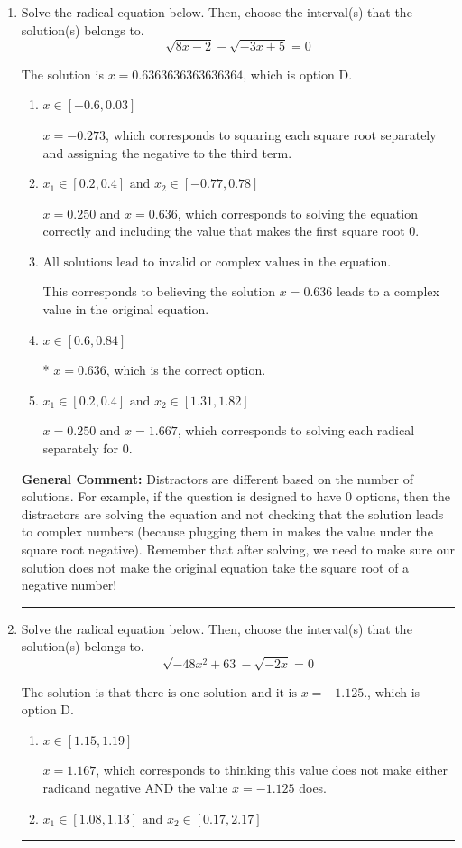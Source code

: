 \documentclass{extbook}[14pt]
\newcommand{\litem}[1]{\item #1

\rule{\textwidth}{0.4pt}}
\begin{document}
\begin{enumerate}\litem{
Solve the radical equation below. Then, choose the interval(s) that the solution(s) belongs to.
\[ \sqrt{8 x - 2} - \sqrt{-3 x + 5} = 0 \]

The solution is \( x = 0.6363636363636364 \), which is option D.\begin{enumerate}[label=\Alph*.]
\item \( x \in [-0.6,0.03] \)

$x = -0.273$, which corresponds to squaring each square root separately and assigning the negative to the third term.
\item \( x_1 \in [0.2, 0.4] \text{ and } x_2 \in [-0.77,0.78] \)

$x = 0.250$ and $x = 0.636$, which corresponds to solving the equation correctly and including the value that makes the first square root 0.
\item \( \text{All solutions lead to invalid or complex values in the equation.} \)

This corresponds to believing the solution $x = 0.636$ leads to a complex value in the original equation.
\item \( x \in [0.6,0.84] \)

* $x = 0.636$, which is the correct option.
\item \( x_1 \in [0.2, 0.4] \text{ and } x_2 \in [1.31,1.82] \)

$x = 0.250$ and $x = 1.667$, which corresponds to solving each radical separately for 0.
\end{enumerate}

\textbf{General Comment:} Distractors are different based on the number of solutions. For example, if the question is designed to have 0 options, then the distractors are solving the equation and not checking that the solution leads to complex numbers (because plugging them in makes the value under the square root negative). Remember that after solving, we need to make sure our solution does not make the original equation take the square root of a negative number!
}
\litem{
Solve the radical equation below. Then, choose the interval(s) that the solution(s) belongs to.
\[ \sqrt{-48 x^2 + 63} - \sqrt{-2 x} = 0 \]

The solution is \( \text{that there is one solution and it is } x = -1.125. \), which is option D.\begin{enumerate}[label=\Alph*.]
\item \( x \in [1.15,1.19] \)

$x = 1.167$, which corresponds to thinking this value does not make either radicand negative AND the value $x = -1.125$ does.
\item \( x_1 \in [1.08, 1.13] \text{ and } x_2 \in [0.17,2.17] \)


\end{enumerate}}
\end{enumerate}
\end{document}
